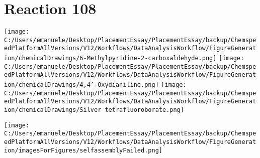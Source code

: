 \documentclass{article}%
\begin{document}
\section*{Reaction 108}%
%
\begin{scheme}[H]%
\begin{minipage}{0.5\textwidth}%
\texttt{[image: C:/Users/emanuele/Desktop/PlacementEssay/PlacementEssay/backup/ChemspeedPlatformAllVersions/V12/Workflows/DataAnalysisWorkflow/FigureGeneration/chemicalDrawings/6-Methylpyridine-2-carboxaldehyde.png]}%
\texttt{[image: C:/Users/emanuele/Desktop/PlacementEssay/PlacementEssay/backup/ChemspeedPlatformAllVersions/V12/Workflows/DataAnalysisWorkflow/FigureGeneration/chemicalDrawings/4,4'-Oxydianiline.png]}%
\texttt{[image: C:/Users/emanuele/Desktop/PlacementEssay/PlacementEssay/backup/ChemspeedPlatformAllVersions/V12/Workflows/DataAnalysisWorkflow/FigureGeneration/chemicalDrawings/Silver tetrafluoroborate.png]}%
\end{minipage}%
\begin{minipage}{0.5\textwidth}%
\begin{center}%
\texttt{[image: C:/Users/emanuele/Desktop/PlacementEssay/PlacementEssay/backup/ChemspeedPlatformAllVersions/V12/Workflows/DataAnalysisWorkflow/FigureGeneration/imagesForFigures/selfassemblyFailed.png]}%
\end{center}%
\end{minipage}%
\caption{Self-assembly of components 8, 15, with Silver(I) in a 3.0:1.5:1.0 molar ratio in CH$_3$CN at 60\textdegree C for 40h. These are the reagents (starting materials) for reaction 108.}%
\end{scheme}%
\end{document}
